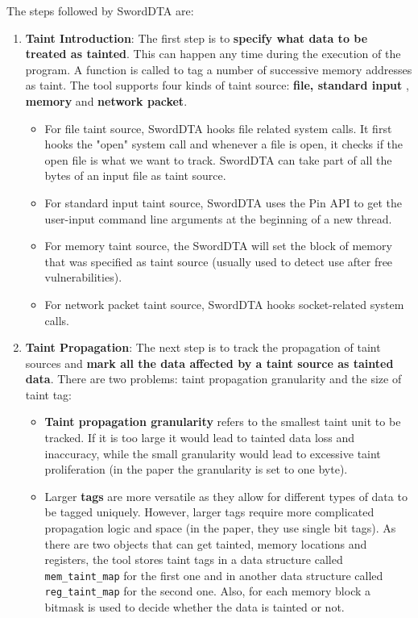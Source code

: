 \documentclass[10pt,a4paper,english,onecolumn]{IEEEtran}
\begin{document}
The steps followed by SwordDTA are:

\begin{enumerate}
    \item \textbf{Taint Introduction}: The first step is to \textbf{specify what data to be treated as tainted}. This can happen any time during the execution of the program. A function is called to tag a number of successive memory addresses as taint. The tool supports four kinds of taint source: \textbf{file, standard input} , \textbf{memory} and \textbf{network packet}.
        \begin{itemize}
            \item For file taint source, SwordDTA hooks file related system calls. It first hooks the "open" system call and whenever a file is open, it checks if the open file is what we want to track. SwordDTA can take part of all the bytes of an input file as taint source.
            \item For standard input taint source, SwordDTA uses the Pin API to get the user-input command line arguments at the beginning of a new thread.
            \item For memory taint source, the SwordDTA will set the block of memory that was specified as taint source (usually used to detect use after free vulnerabilities).
            \item For network packet taint source, SwordDTA hooks socket-related system calls.
        \end{itemize}
    \item \textbf{Taint Propagation}: The next step is to track the propagation of taint sources and \textbf{mark all the data affected by a taint source as tainted data}. There are two problems: taint propagation granularity and the size of taint tag:
        \begin{itemize}
            \item \textbf{Taint propagation granularity} refers to the smallest taint unit to be tracked. If it is too large it would lead to tainted data loss and inaccuracy, while the small granularity would lead to excessive taint proliferation (in the paper the granularity is set to one byte).
            \item Larger \textbf{tags} are more versatile as they allow for different types of data to be tagged uniquely. However, larger tags require more complicated propagation logic and space (in the paper, they use single bit tags). As there are two objects that can get tainted, memory locations and registers, the tool stores taint tags in a data structure called \texttt{mem_taint_map} for the first one and in another data structure called \texttt{reg_taint_map} for the second one. Also, for each memory block a bitmask is used to decide whether the data is tainted or not.

\end{itemize}
\end{enumerate}
\end{document}

